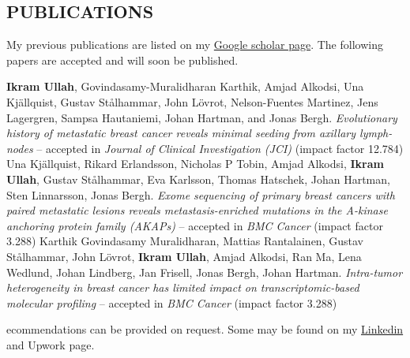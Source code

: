 \documentclass[margin, 10pt]{res} %
\begin{document}
\begin{resume}
\section{PUBLICATIONS} 
My previous publications are listed on my \href{https://scholar.google.com/citations?user=HjM0XDoAAAAJ&hl=en}{Google scholar page}. The following papers are accepted and will soon be published.
\begingroup
\renewcommand{\section}[2]{}%
\begin{thebibliography}{}
    \textbf{Ikram Ullah}, Govindasamy-Muralidharan Karthik, Amjad Alkodsi, Una Kj\"allquist, Gustav St\aa lhammar, John L\"ovrot, Nelson-Fuentes Martinez, Jens Lagergren, Sampsa Hautaniemi, Johan Hartman, and Jonas Bergh. \textit{Evolutionary history of metastatic breast cancer reveals minimal seeding from axillary lymph-nodes} -- accepted in {\sl Journal of Clinical Investigation (JCI)} (impact factor 12.784)
    Una Kj\"allquist, Rikard Erlandsson, Nicholas P Tobin, Amjad Alkodsi, \textbf{Ikram Ullah}, Gustav St\aa lhammar, Eva Karlsson, Thomas Hatschek, Johan Hartman, Sten Linnarsson, Jonas Bergh. \textit{Exome sequencing of primary breast cancers with paired metastatic lesions reveals metastasis-enriched mutations in the A-kinase anchoring protein family (AKAPs)} -- accepted in {\sl BMC Cancer} (impact factor 3.288)
    Karthik Govindasamy Muralidharan, Mattias Rantalainen, Gustav St\aa lhammar, John L\"ovrot, \textbf{Ikram Ullah}, Amjad Alkodsi, Ran Ma, Lena Wedlund, Johan Lindberg, Jan Frisell, Jonas Bergh, Johan Hartman. \textit{Intra-tumor heterogeneity in breast cancer has limited impact on transcriptomic-based molecular profiling} -- accepted in {\sl BMC Cancer} (impact factor 3.288)
\end{thebibliography}
\endgroup



\section{RECOMMEND- \\-ATIONS AND \\ REFERENCES } 
Recommendations can be provided on request. Some may be found on my \href{https://www.linkedin.com/in/ikramu/}{Linkedin} and Upwork page.  %


\end{resume}
\end{document}
